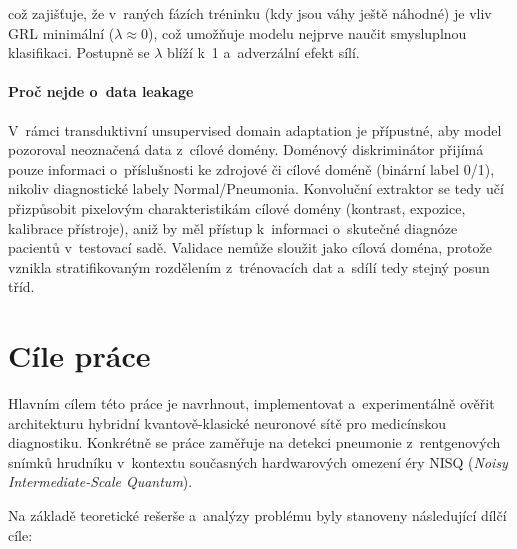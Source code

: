 \documentclass[12pt, a4paper]{report}
\begin{document}
což zajišťuje, že v~raných fázích tréninku (kdy jsou váhy ještě náhodné) je vliv GRL minimální ($\lambda \approx 0$), což umožňuje modelu nejprve naučit smysluplnou klasifikaci. Postupně se $\lambda$ blíží k~1 a~adverzální efekt sílí.

\subsubsection{Proč nejde o~data leakage}

V~rámci transduktivní unsupervised domain adaptation je přípustné, aby model pozoroval neoznačená data z~cílové domény. Doménový diskriminátor přijímá pouze informaci o~příslušnosti ke zdrojové či cílové doméně (binární label 0/1), nikoliv diagnostické labely Normal/Pneumonia. Konvoluční extraktor se tedy učí přizpůsobit pixelovým charakteristikám cílové domény (kontrast, expozice, kalibrace přístroje), aniž by měl přístup k~informaci o~skutečné diagnóze pacientů v~testovací sadě. Validace nemůže sloužit jako cílová doména, protože vznikla stratifikovaným rozdělením z~trénovacích dat a~sdílí tedy stejný posun tříd.


\chapter{Cíle práce} \label{chap:cile}

Hlavním cílem této práce je navrhnout, implementovat a~experimentálně ověřit
architekturu hybridní kvantově-klasické neuronové sítě pro medicínskou
diagnostiku. Konkrétně se práce zaměřuje na detekci pneumonie z~rentgenových
snímků hrudníku v~kontextu současných hardwarových omezení éry NISQ
(\emph{Noisy Intermediate-Scale Quantum}).

Na základě teoretické rešerše a~analýzy problému byly stanoveny následující
dílčí cíle:
\end{document}
